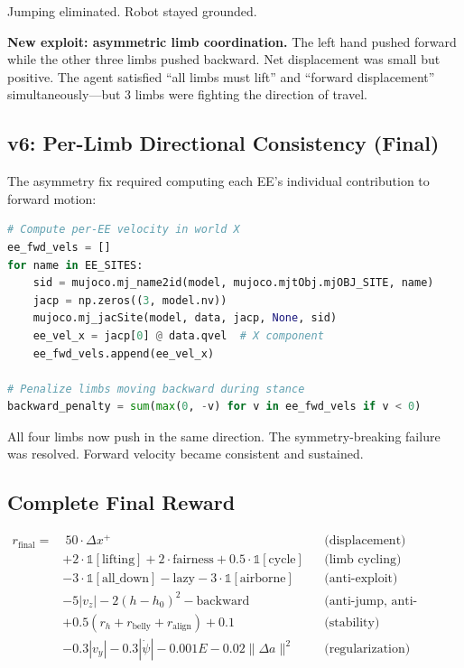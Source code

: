 \documentclass[11pt, a4paper]{article}
\begin{document}
\begin{fixbox}
Jumping eliminated. Robot stayed grounded.
\end{fixbox}
\begin{failbox}
\textbf{New exploit: asymmetric limb coordination.} The left hand pushed forward while the other three limbs pushed backward. Net displacement was small but positive. The agent satisfied ``all limbs must lift'' and ``forward displacement'' simultaneously---but 3 limbs were fighting the direction of travel.
\end{failbox}

\subsection{v6: Per-Limb Directional Consistency (Final)}

The asymmetry fix required computing each EE's individual contribution to forward motion:

\begin{lstlisting}[language=Python, caption={Per-limb directional consistency.}]
# Compute per-EE velocity in world X
ee_fwd_vels = []
for name in EE_SITES:
    sid = mujoco.mj_name2id(model, mujoco.mjtObj.mjOBJ_SITE, name)
    jacp = np.zeros((3, model.nv))
    mujoco.mj_jacSite(model, data, jacp, None, sid)
    ee_vel_x = jacp[0] @ data.qvel  # X component
    ee_fwd_vels.append(ee_vel_x)

# Penalize limbs moving backward during stance
backward_penalty = sum(max(0, -v) for v in ee_fwd_vels if v < 0)
\end{lstlisting}

\begin{fixbox}
All four limbs now push in the same direction. The symmetry-breaking failure was resolved. Forward velocity became consistent and sustained.
\end{fixbox}

\subsection{Complete Final Reward}

\begin{equation}
\boxed{
\begin{aligned}
r_{\text{final}} = &\ 50 \cdot \Delta x^+ && \text{(displacement)} \\
  &+ 2 \cdot \mathbb{1}[\text{lifting}] + 2 \cdot \text{fairness} + 0.5 \cdot \mathbb{1}[\text{cycle}] && \text{(limb cycling)} \\
  &- 3 \cdot \mathbb{1}[\text{all\_down}] - \text{lazy} - 3 \cdot \mathbb{1}[\text{airborne}] && \text{(anti-exploit)} \\
  &- 5|v_z| - 2(h-h_0)^2 - \text{backward} && \text{(anti-jump, anti-asymmetry)} \\
  &+ 0.5(r_h + r_\text{belly} + r_\text{align}) + 0.1 && \text{(stability)} \\
  &- 0.3|v_y| - 0.3|\dot\psi| - 0.001E - 0.02\|\Delta a\|^2 && \text{(regularization)}
\end{aligned}
}
\end{equation}
\end{document}
